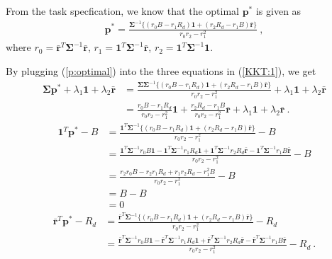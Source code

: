 \documentclass[12pt]{ftec2101}
\newcommand{\vect}[1]{\mathbf{#1}}
\begin{document}
\noindent
From the task specfication, we know that the optimal $\vect{p}^{*}$ is given as
\begin{align}
    \vect{p}^{*} = \frac{\boldsymbol{\Sigma}^{-1}\{(r_0 B-r_1 R_d)\vect{1}+(r_2 R_d- r_1 B)\bar{\vect{r}}\}}{r_0 r_2 - r_1^2} \ ,
    \label{p:optimal}
\end{align}
where $r_0 = \bar{\vect{r}}^T \boldsymbol{\Sigma}^{-1} \bar{\vect{r}}$, $r_1 = \vect{1}^T \boldsymbol{\Sigma}^{-1} \bar{\vect{r}}$, $r_2 = \vect{1}^T \boldsymbol{\Sigma}^{-1} \vect{1}$.

\noindent
By plugging (\ref{p:optimal}) into the three equations in (\ref{KKT:1}), we get
\begin{align}
    \boldsymbol{\Sigma} \vect{p}^{*} +\lambda_1 \vect{1} + \lambda_2 \bar{\vect{r}}&= \frac{\boldsymbol{\Sigma}\boldsymbol{\Sigma}^{-1}\{(r_0 B - r_1 R_d)\vect{1}+(r_2 R_d - r_1 B)\bar{\vect{r}}\}}{r_0 r_2 -r_1^2} + \lambda_1 \vect{1} + \lambda_2 \bar{\vect{r}} \\
    &= \frac{r_0 B-r_1 R_d}{r_0 r_2 -r_1^2}\vect{1}+\frac{r_2 R_d - r_1 B}{r_0 r_2 -r_1^2}\bar{\vect{r}} + \lambda_1 \vect{1} +\lambda_2 \bar{\vect{r}}\ .
    \label{KKT:in:1}
\end{align}
\begin{align}
    \vect{1}^T \vect{p}^{*} - B &= \frac{\vect{1}^T\boldsymbol{\Sigma}^{-1}\{(r_0 B-r_1 R_d)\vect{1}+(r_2 R_d - r_1 B)\bar{\vect{r}}\}}{r_0 r_2 - r_1^2}- B \\
    & = \frac{\vect{1}^T\boldsymbol{\Sigma}^{-1}r_0 B \vect{1}-\vect{1}^T\boldsymbol{\Sigma}^{-1}r_1 R_d \vect{1}+\vect{1}^T\boldsymbol{\Sigma}^{-1}r_2 R_d \bar{\vect{r}}-\vect{1}^T \boldsymbol{\Sigma}^{-1} r_1 B \bar{\vect{r}}}{r_0 r_2 -r_1^2} - B \\
    & = \frac{r_2 r_0 B - r_2 r_1 R_d + r_1 r_2 R_d -r_1^2 B}{r_0 r_2 -r_1^2} - B \\
    & = B - B \\
    & = 0
    \label{KKT:in:2}
\end{align}
\begin{align}
    \bar{\vect{r}}^T \vect{p}^{*} -R_d &= \frac{\bar{\vect{r}}^T\boldsymbol{\Sigma}^{-1}\{(r_0 B-r_1 R_d)\vect{1}+(r_2 R_d - r_1 B)\bar{\vect{r}}\}}{r_0 r_2 - r_1^2}- R_d \\
    &= \frac{\bar{\vect{r}}^T\boldsymbol{\Sigma}^{-1}r_0 B \vect{1}-\bar{\vect{r}}^T\boldsymbol{\Sigma}^{-1}r_1 R_d \vect{1}+\bar{\vect{r}}^T\boldsymbol{\Sigma}^{-1}r_2 R_d \bar{\vect{r}}-\bar{\vect{r}}^T \boldsymbol{\Sigma}^{-1} r_1 B \bar{\vect{r}}}{r_0 r_2 -r_1^2} - R_d \ .
    \label{KKT:in:3:half}
\end{align}
\end{document}
